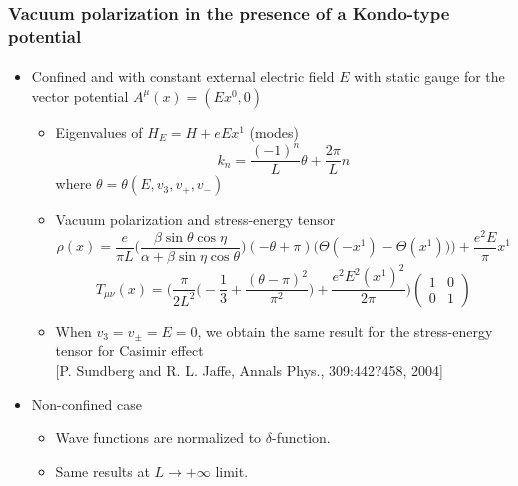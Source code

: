 \documentclass[english]{beamer}
\begin{document}
\begin{frame}[shrink=30]
\frametitle{\small{Vacuum polarization in the presence of a Kondo-type potential}}
\framesubtitle{}

\begin{itemize}

\item<1-> Confined and with constant external electric field $E$ with static gauge for the vector potential $A^\mu(x) = (Ex^0, 0)$

\begin{itemize}
\item<2-> Eigenvalues of $H_E = H + eEx^1 $ (modes)
\begin{equation*}
k_{n} = \frac{(-1)^n}{L}  \theta + \frac{2\pi}{L}n 
\end{equation*}
where $\theta = \theta(E, v_3, v_+, v_-)$
%
\item<3-> Vacuum polarization and stress-energy tensor
\begin{equation*}
\rho(x) = \frac{e}{\pi L}\Big( \frac{\beta \sin \theta \cos \eta}{\alpha + \beta \sin \eta \cos \theta}\Big) (-\theta + \pi)
\Big(\Theta(- x^1) - \Theta(x^1))\Big) + \frac{e^2 E}{\pi} x^1
\end{equation*}
%
\begin{equation*}
T_{\mu\nu}(x) = 
\bigg( \frac{\pi}{2L^2}\big( -\frac{1}{3} + \frac{(\theta - \pi)^2}{\pi^2}\big) + \frac{e^2E^2(x^1)^2}{2 \pi} \bigg)
\begin{pmatrix}
1 & 0 \\ 0 & 1
\end{pmatrix}
\end{equation*}
%
\item<3-> When $v_3 = v_\pm = E = 0$, we obtain the same result for the stress-energy tensor for Casimir effect \\
\tiny\color{blue}[P. Sundberg and R. L. Jaffe, Annals Phys., 309:442?458, 2004]\normalsize\color{black}
\end{itemize}
%
\item Non-confined case
\begin{itemize}
\item<4-> Wave functions are normalized to $\delta$-function.
\item<5-> Same results at $L\rightarrow +\infty $ limit.
\end{itemize}

\end{itemize}

\end{frame}
\end{document}
